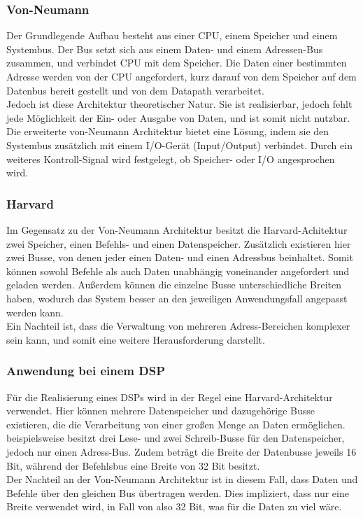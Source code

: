\subsubsection{Von-Neumann}
Der Grundlegende Aufbau besteht aus einer CPU, einem Speicher und einem Systembus. 
Der Bus setzt sich aus einem Daten- und einem Adressen-Bus zusammen, und verbindet CPU mit dem Speicher. Die Daten einer bestimmten Adresse werden von der CPU angefordert, kurz darauf von dem Speicher auf dem Datenbus bereit gestellt und von dem Datapath verarbeitet.\\
Jedoch ist diese Architektur theoretischer Natur. Sie ist realisierbar, jedoch fehlt jede Möglichkeit der Ein- oder Ausgabe von Daten, und ist somit nicht nutzbar.\\
Die erweiterte von-Neumann Architektur bietet eine Lösung, indem sie den Systembus zusätzlich mit einem I/O-Gerät (Input/Output) verbindet. Durch ein weiteres Kontroll-Signal wird festgelegt, ob Speicher- oder I/O angesprochen wird. 

\subsubsection{Harvard}
Im Gegensatz zu der Von-Neumann Architektur besitzt die Harvard-Achitektur zwei Speicher, einen Befehls- und einen Datenspeicher. Zusätzlich existieren hier zwei Busse, von denen jeder einen Daten- und einen Adressbus beinhaltet. Somit können sowohl Befehle als auch Daten unabhängig voneinander angefordert und geladen werden. Außerdem können die einzelne Busse unterschiedliche Breiten haben, wodurch das System besser an den jeweiligen Anwendungsfall angepasst werden kann.\\
Ein Nachteil ist, dass die Verwaltung von mehreren Adress-Bereichen komplexer sein kann, und somit eine weitere Herausforderung darstellt.

\subsubsection{Anwendung bei einem DSP}
Für die Realisierung eines DSPs wird in der Regel eine Harvard-Architektur verwendet. Hier können mehrere Datenspeicher und dazugehörige Busse existieren, die die Verarbeitung von einer großen Menge an Daten ermöglichen. \cite{TI_c55x} beispielsweise besitzt drei Lese- und zwei Schreib-Busse für den Datenspeicher, jedoch nur einen Adress-Bus. Zudem beträgt die Breite der Datenbusse jeweils 16 Bit, während der Befehlsbus eine Breite von 32 Bit besitzt.\\
Der Nachteil an der Von-Neumann Architektur ist in diesem Fall, dass Daten und Befehle über den gleichen Bus übertragen werden.  Dies impliziert, dass nur eine Breite verwendet wird, in Fall von \cite{TI_c55x} also 32 Bit, was für die Daten zu viel wäre.

